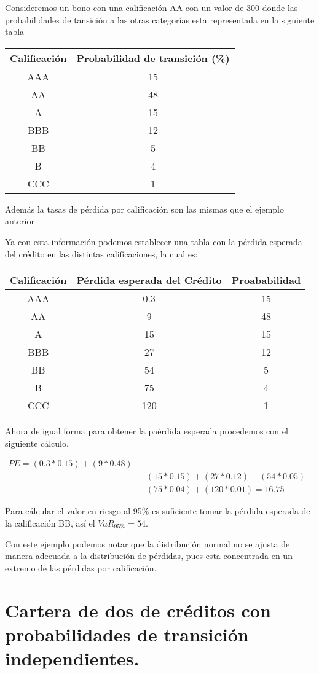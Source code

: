 \documentclass[
  12pt,
]{krantz}
\theoremstyle{definition}
\theoremstyle{definition}
\theoremstyle{definition}
\theoremstyle{remark}
\begin{document}
Consideremos un bono con una calificación AA con un valor de 300 donde las probabilidades de tansición a las otras categorías esta representada en la siguiente tabla

\begin{longtable}[]{@{}cc@{}}
\toprule
Calificación & Probabilidad de transición (\%)\tabularnewline
\midrule
\endhead
AAA & 15\tabularnewline
AA & 48\tabularnewline
A & 15\tabularnewline
BBB & 12\tabularnewline
BB & 5\tabularnewline
B & 4\tabularnewline
CCC & 1\tabularnewline
\bottomrule
\end{longtable}

Además la tasas de pérdida por calificación son las mismas que el ejemplo anterior

Ya con esta información podemos establecer una tabla con la pérdida esperada del crédito en las distintas calificaciones, la cual es:

\begin{longtable}[]{@{}ccc@{}}
\toprule
Calificación & Pérdida esperada del Crédito & Proababilidad\tabularnewline
\midrule
\endhead
AAA & 0.3 & 15\tabularnewline
AA & 9 & 48\tabularnewline
A & 15 & 15\tabularnewline
BBB & 27 & 12\tabularnewline
BB & 54 & 5\tabularnewline
B & 75 & 4\tabularnewline
CCC & 120 & 1\tabularnewline
\bottomrule
\end{longtable}

Ahora de igual forma para obtener la paérdida esperada procedemos con el siguiente cálculo.

\begin{align*} 
PE = (0.3*0.15)+(9*0.48)& \\
&+(15*0.15)+(27*0.12)+(54*0.05)&\\
&+(75*0.04) +(120*0.01)=16.75
\end{align*}

Para cálcular el valor en riesgo al 95\% es suficiente tomar la pérdida esperada de la calificación BB, así el \(VaR_{95\%}=54\).

Con este ejemplo podemos notar que la distribución normal no se ajusta de manera adecuada a la distribución de pérdidas, pues esta concentrada en un extremo de las pérdidas por calificación.

\hypertarget{cartera-de-dos-de-creditos-con-probabilidades-de-transicion-independientes.}{%
\section{Cartera de dos de créditos con probabilidades de transición independientes.}\label{cartera-de-dos-de-creditos-con-probabilidades-de-transicion-independientes.}}
\end{document}
